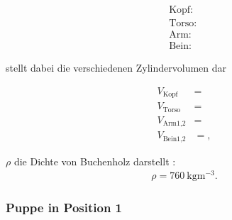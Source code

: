 \begin{subequations}
\begin{align}
\text{Kopf: }\label{eq:21a}\\
\text{Torso: }\label{eq:21b}\\
\text{Arm: }\label{eq:21c}\\
\text{Bein: }\label{eq:21d}
\end{align}
\end{subequations}

\justifying stellt dabei die verschiedenen Zylindervolumen dar

\begin{subequations}
\begin{align}
 V_{\text{Kopf}} &= \label{eq:22a}\\
 V_{\text{Torso}} &= \label{eq:22b}\\
 V_{\text{Arm1,2}} &= \label{eq:22c}\\
 V_{\text{Bein1,2}} &= \label{eq:22d},
\end{align}
\end{subequations}

\justifying $\rho$ die Dichte von Buchenholz darstellt \cite{Holzdichte}:
\begin{align}
    \rho = \SI{760}{\kilo\gram\meter\tothe{-3}}\label{eq:23}.
\end{align}

\subsubsection{Puppe in Position 1}\label{sec:Puppe1} %

